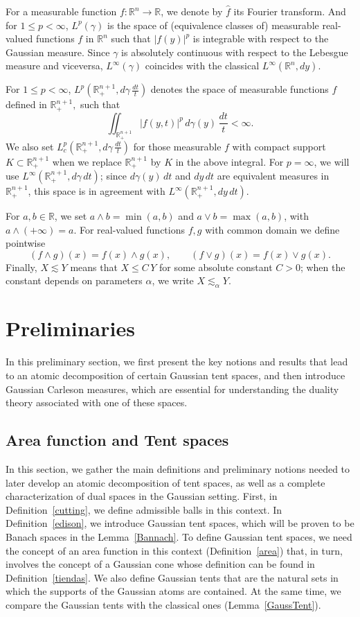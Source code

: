 \documentclass[leqno,11pt]{amsart}
\theoremstyle{plain}
\theoremstyle{remark}
\begin{document}
\noindent For a measurable function $f:\mathbb{R}^n\to\mathbb{R}$, we denote by $\widehat{f}$ its Fourier transform.
And for $1\le p<\infty$, $L^p(\gamma)$ is the space of (equivalence classes of) measurable real-valued functions $f$ in $\mathbb{R}^n$ such that $|f(y)|^p$ is integrable with respect to the Gaussian measure. 
 Since $\gamma$ is absolutely continuous with respect to the Lebesgue measure and viceversa, $L^\infty(\gamma)$ coincides with the classical $L^\infty(\mathbb{R}^n,dy)$.
 

\noindent For $1\le p<\infty$, $L^p(\mathbb{R}^{n+1}_+,d\gamma\,\tfrac{dt}{t})$ denotes the space of measurable functions $f$ defined in $\mathbb{R}^{n+1}_+,$ such that
\[
\iint_{\mathbb{R}^{n+1}_+} |f(y,t)|^p\, d\gamma(y)\,\frac{dt}{t}<\infty.
\]
We also set $L^p_c(\mathbb{R}^{n+1}_+,d\gamma\,\tfrac{dt}{t})$ for those measurable $f$ with compact support $K\subset\mathbb{R}^{n+1}_+$ 
when we replace $\mathbb{R}^{n+1}_+$ by $K$ in the above integral.
For $p=\infty$, we will use $L^\infty(\mathbb{R}^{n+1}_+,d\gamma\,dt)$; since $d\gamma(y)\,dt$ and $dy\,dt$ are equivalent measures in $\mathbb{R}^{n+1}_+$, this space is in agreement with $L^\infty(\mathbb{R}^{n+1}_+,dy\,dt)$. 
 

For $a,b\in\mathbb{R}$, we set $a\wedge b=\min(a,b)$ and $a\vee b=\max(a,b)$, with $a\wedge(+\infty)=a$. For real-valued functions $f,g$ with common domain we define pointwise
\[
(f\wedge g)(x)=f(x)\wedge g(x),\qquad (f\vee g)(x)=f(x)\vee g(x).
\]
Finally, $X\lesssim Y$ means that $X\le C\,Y$ for some absolute constant $C>0$; when the constant depends on parameters $\alpha$, we write $X\lesssim_\alpha Y$.

\section{Preliminaries}\label{prelim}
In this preliminary section, we first present the key notions and results that lead to an atomic decomposition of certain Gaussian tent spaces, and then introduce Gaussian Carleson measures, which are essential for understanding the duality theory associated with one of these spaces.

\subsection{Area function and Tent spaces}
In this section, we gather the main definitions and preliminary notions needed to later develop an atomic decomposition of tent spaces, as well as a complete characterization of dual spaces in the Gaussian setting.
First, in Definition~\ref{cutting}, we define admissible balls in this context. In Definition~\ref{edison}, we introduce Gaussian tent spaces, which will be proven to be Banach spaces in the Lemma~\ref{Bannach}.
To define Gaussian tent spaces, we need the concept of an area function in this context (Definition~\ref{area}) that, in turn, involves the concept of a Gaussian cone whose definition can be found in
Definition~\ref{tiendas}. We also define Gaussian tents that are the natural sets in which the supports of the Gaussian atoms 
are contained.
  At the same time, we compare the Gaussian tents with the classical ones (Lemma~\ref{GaussTent}).
  
\end{document}
